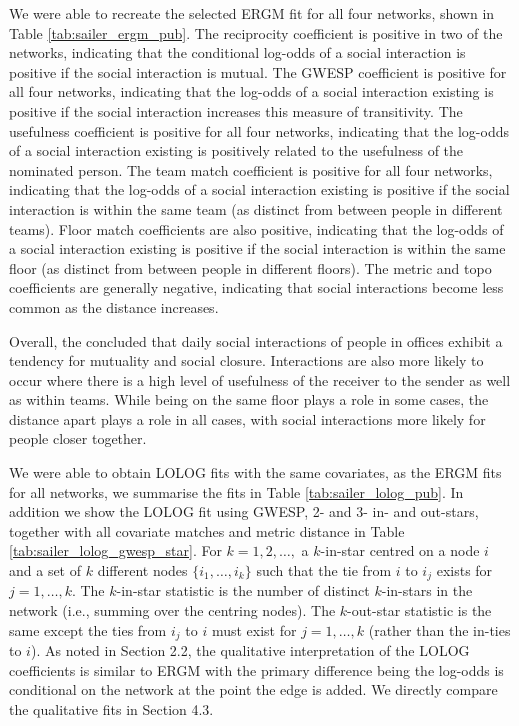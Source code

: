 \documentclass[
]{statsoc}
\begin{document}
We were able to recreate the selected ERGM fit for all four networks,
shown in Table \ref{tab:sailer_ergm_pub}. The reciprocity coefficient is
positive in two of the networks, indicating that the conditional
log-odds of a social interaction is positive if the social interaction
is mutual. The GWESP coefficient is positive for all four networks,
indicating that the log-odds of a social interaction existing is
positive if the social interaction increases this measure of
transitivity. The usefulness coefficient is positive for all four
networks, indicating that the log-odds of a social interaction existing
is positively related to the usefulness of the nominated person. The
team match coefficient is positive for all four networks, indicating
that the log-odds of a social interaction existing is positive if the
social interaction is within the same team (as distinct from between
people in different teams). Floor match coefficients are also positive,
indicating that the log-odds of a social interaction existing is
positive if the social interaction is within the same floor (as distinct
from between people in different floors). The metric and topo
coefficients are generally negative, indicating that social interactions
become less common as the distance increases.

Overall, the \cite{Sailer2012} concluded that daily social interactions
of people in offices exhibit a tendency for mutuality and social
closure. Interactions are also more likely to occur where there is a
high level of usefulness of the receiver to the sender as well as within
teams. While being on the same floor plays a role in some cases, the
distance apart plays a role in all cases, with social interactions more
likely for people closer together.

We were able to obtain LOLOG fits with the same covariates, as the ERGM
fits for all networks, we summarise the fits in Table
\ref{tab:sailer_lolog_pub}. In addition we show the LOLOG fit using
GWESP, 2- and 3- in- and out-stars, together with all covariate matches
and metric distance in Table \ref{tab:sailer_lolog_gwesp_star}. For
\(k=1, 2, \ldots,\) a \(k\)-in-star centred on a node \(i\) and a set of
\(k\) different nodes \(\{i_1, \ldots, i_{k}\}\) such that the tie from
\(i\) to \(i_{j}\) exists for \(j=1, \ldots, k\). The \(k\)-in-star
statistic is the number of distinct \(k\)-in-stars in the network (i.e.,
summing over the centring nodes). The \(k\)-out-star statistic is the
same except the ties from \(i_{j}\) to \(i\) must exist for
\(j=1, \ldots, k\) (rather than the in-ties to \(i\)). As noted in
Section 2.2, the qualitative interpretation of the LOLOG coefficients is
similar to ERGM with the primary difference being the log-odds is
conditional on the network at the point the edge is added. We directly
compare the qualitative fits in Section 4.3.
\end{document}
